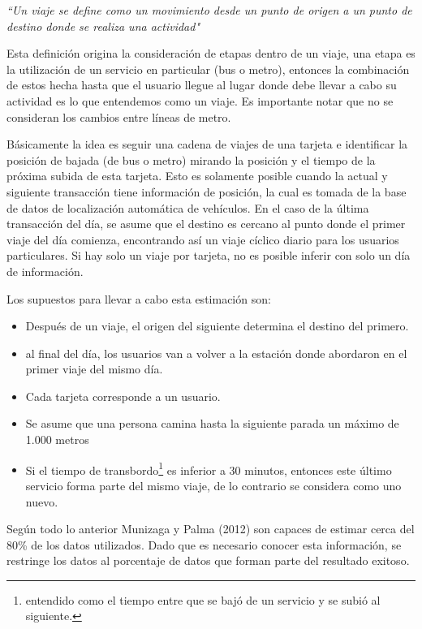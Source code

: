 \documentclass[12pt]{article}
\begin{document}
\begin{center}
	\textit{``Un viaje se define como un movimiento desde un punto de origen a un punto de destino donde se realiza una actividad"}
\end{center} 

Esta definición origina la consideración de etapas dentro de un viaje, una etapa es la utilización de un servicio en particular (bus o metro), entonces la combinación de estos hecha hasta que el usuario llegue al lugar donde debe llevar a cabo su actividad es lo que entendemos como un viaje. Es importante notar que no se consideran los cambios entre líneas de metro.

Básicamente la idea es seguir una cadena de viajes de una tarjeta e identificar la posición de bajada (de bus o metro) mirando la posición y el tiempo de la próxima subida de esta tarjeta. Esto es solamente posible cuando la actual y siguiente transacción tiene información de posición, la cual es tomada de la base de datos de localización automática de vehículos. En el caso de la última transacción del día, se asume que el destino es cercano al punto donde el primer viaje del día comienza, encontrando así un viaje cíclico diario para los usuarios particulares. Si hay solo un viaje por tarjeta, no es posible inferir con solo un día de información.

Los supuestos para llevar a cabo esta estimación son: 
\begin{itemize}
	\item Después de un viaje, el origen del siguiente determina el destino del primero. \cite{Supuesto_Barry}
	\item al final del día, los usuarios van a volver a la estación donde abordaron en el primer viaje del mismo día. \cite{Supuesto_Barry}
	\item Cada tarjeta corresponde a un usuario. \cite{Procesamiento_datos}
	\item Se asume que una persona camina hasta la siguiente parada un máximo de 1.000 metros \cite{Procesamiento_datos}
	\item Si el tiempo de transbordo\footnote{entendido como el tiempo entre que se bajó de un servicio y se subió al siguiente.} es inferior a 30 minutos, entonces este último servicio forma parte del mismo viaje, de lo contrario se considera como uno nuevo.\cite{Procesamiento_datos}
\end{itemize}

Según todo lo anterior Munizaga y Palma (2012)\cite{Procesamiento_datos} son capaces de estimar cerca del 80\% de los datos utilizados. Dado que es necesario conocer esta información, se restringe los datos al porcentaje de datos que forman parte del resultado exitoso.
\end{document}
